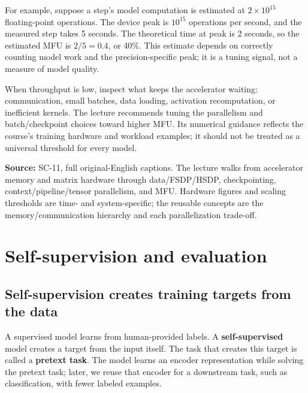 For example, suppose a step's model computation is estimated at \(2\times10^{15}\) floating-point operations. The device peak is \(10^{15}\) operations per second, and the measured step takes 5 seconds. The theoretical time at peak is 2 seconds, so the estimated MFU is \(2/5=0.4\), or 40\%. This estimate depends on correctly counting model work and the precision-specific peak; it is a tuning signal, not a measure of model quality.

When throughput is low, inspect what keeps the accelerator waiting: communication, small batches, data loading, activation recomputation, or inefficient kernels. The lecture recommends tuning the parallelism and batch/checkpoint choices toward higher MFU. Its numerical guidance reflects the course's training hardware and workload examples; it should not be treated as a universal threshold for every model.

\textbf{Source:} SC-11, full original-English captions. The lecture walks from accelerator memory and matrix hardware through data/FSDP/HSDP, checkpointing, context/pipeline/tensor parallelism, and MFU. Hardware figures and scaling thresholds are time- and system-specific; the reusable concepts are the memory/communication hierarchy and each parallelization trade-off.

\section{Self-supervision and evaluation}\label{04-visual-computing-ii-ch031-self-supervision-and-evaluation}

\hypertarget{04-visual-computing-ii-ch031-self-supervision-and-evaluation}{}

\subsection{Self-supervision creates training targets from the data}\label{04-visual-computing-ii-ch031-self-supervision-creates-training-targets-from-the-data}

\hypertarget{04-visual-computing-ii-ch031-self-supervision-creates-training-targets-from-the-data}{}

A supervised model learns from human-provided labels. A \textbf{self-supervised} model creates a target from the input itself. The task that creates this target is called a \textbf{pretext task}. The model learns an encoder representation while solving the pretext task; later, we reuse that encoder for a downstream task, such as classification, with fewer labeled examples.

